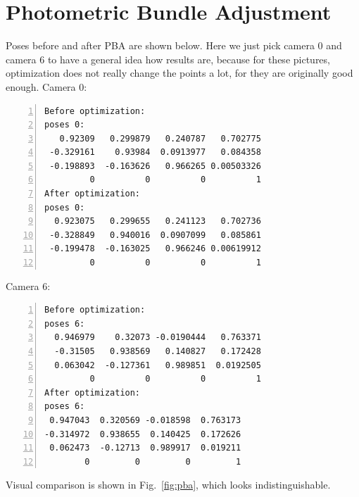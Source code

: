 \documentclass[12pt,a4paper]{article}
\begin{document}
    \section{Photometric Bundle Adjustment}
    
    Poses before and after PBA are shown below. 
    Here we just pick camera 0 and camera 6 
    to have a general idea how results are,
    because for these pictures,
    optimization does not really change the points a lot,
    for they are originally good enough.
    Camera 0:
    \begin{lstlisting}[frame=single,numbers=left]
Before optimization:
poses 0: 
   0.92309   0.299879   0.240787   0.702775
 -0.329161    0.93984  0.0913977   0.084358
 -0.198893  -0.163626   0.966265 0.00503326
         0          0          0          1
After optimization:
poses 0: 
  0.923075   0.299655   0.241123   0.702736
 -0.328849   0.940016  0.0907099   0.085861
 -0.199478  -0.163025   0.966246 0.00619912
         0          0          0          1
    \end{lstlisting}
    Camera 6:
    \begin{lstlisting}[frame=single,numbers=left]
Before optimization:
poses 6: 
  0.946979    0.32073 -0.0190444   0.763371
  -0.31505   0.938569   0.140827   0.172428
  0.063042  -0.127361   0.989851  0.0192505
         0          0          0          1
After optimization:
poses 6: 
 0.947043  0.320569 -0.018598  0.763173
-0.314972  0.938655  0.140425  0.172626
 0.062473  -0.12713  0.989917  0.019211
        0         0         0         1
    \end{lstlisting}
    Visual comparison is shown in Fig.~\ref{fig:pba},
    which looks indistinguishable.
    
\end{document}
